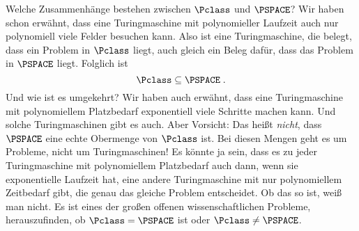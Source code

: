 Welche Zusammenhänge bestehen zwischen $\Pclass$ und $\PSPACE$? Wir haben
schon erwähnt, dass eine Turingmaschine mit polynomieller Laufzeit
auch nur polynomiell viele Felder besuchen kann. Also ist eine
Turingmaschine, die belegt, dass ein Problem in $\Pclass$ liegt, auch
gleich ein Beleg dafür, dass das Problem in $\PSPACE$ liegt. Folglich ist
\[
\Pclass \subseteq \PSPACE \;.
\]
Und wie ist es umgekehrt? Wir haben auch erwähnt, dass eine
Turingmaschine mit polynomiellem Platzbedarf exponentiell viele
Schritte machen kann. Und solche Turingmaschinen gibt es auch. Aber
Vorsicht: Das heißt \emph{nicht}, dass $\PSPACE$ eine echte Obermenge
von $\Pclass$ ist. Bei diesen Mengen geht es um Probleme, nicht um
Turingmaschinen! Es könnte ja sein, dass es zu jeder Turingmaschine
mit polynomiellem Platzbedarf auch dann, wenn sie exponentielle
Laufzeit hat, eine andere Turingmaschine mit nur polynomiellem
Zeitbedarf gibt, die genau das gleiche Problem entscheidet. Ob das so
ist, weiß man nicht. Es ist eines der großen offenen
wissenschaftlichen Probleme, herauszufinden, ob $\Pclass=\PSPACE$ ist oder
$\Pclass\not=\PSPACE$.



